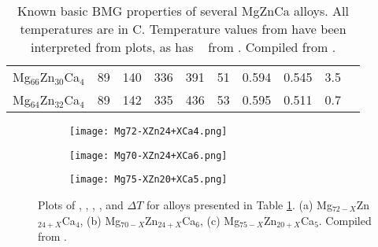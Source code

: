 \documentclass[a4paper,12pt,oneside]{report}%
\begin{document}
\begin{table}[h]
\begin{tabular}{ l l l l l l l l l l }
		Mg$_{66}$Zn$_{30}$Ca$_{4}$ & 89 & 140 & 336 & 391 & 51 & 0.594 & 0.545 & 3.5 & \cite{Cao2013, Cao2012} \\ 
		Mg$_{64}$Zn$_{32}$Ca$_{4}$ & 89 & 142 & 335 & 436 & 53 & 0.595 & 0.511 & 0.7 & \cite{Cao2013, Cao2012} \\
		\bottomrule 
	\end{tabular}
	\caption[Known basic BMG properties of several MgZnCa alloys. All temperatures are in \degree C.]{Known basic BMG properties of several MgZnCa alloys. All temperatures are in \degree C. Temperature values from \cite{Gu2005} have been interpreted from plots, as has \Tg~ from \cite{Wang2013}. Compiled from \cite{Cao2013, Gu2005, Zhou2013, Cao2012, Wang2013}.}
	\label{tab:MgZnCaAlloys}
\end{table}

\begin{figure}[htbp]
	\centering
	\begin{subfigure}[htbp]{0.49\textwidth}
		\texttt{[image: Mg72-XZn24+XCa4.png]}
		\caption{}
		\label{fig:Mg72xZn24xCa4}
	\end{subfigure}
	\begin{subfigure}[htbp]{0.49\textwidth}
		\texttt{[image: Mg70-XZn24+XCa6.png]}
		\caption{}
		\label{fig:Mg70xZn24xCa6}
	\end{subfigure}
	\begin{subfigure}[htbp]{0.49\textwidth}
		\texttt{[image: Mg75-XZn20+XCa5.png]}
		\caption{}
		\label{fig:Mg75xZn20xCa5}
	\end{subfigure}
	\caption[Plots of \Tg, \Tx, \Tm, \Tl, and $\Delta T$ for alloys presented in Table \ref{tab:MgZnCaAlloys}. (a) Mg$_{72-X}$Zn$_{24+X}$Ca$_{4}$, (b) Mg$_{70-X}$Zn$_{24+X}$Ca$_{6}$, (c) Mg$_{75-X}$Zn$_{20+X}$Ca$_{5}$.]{Plots of \Tg, \Tx, \Tm, \Tl, and $\Delta T$ for alloys presented in Table \ref{tab:MgZnCaAlloys}. (a) Mg$_{72-X}$Zn$_{24+X}$Ca$_{4}$, (b) Mg$_{70-X}$Zn$_{24+X}$Ca$_{6}$, (c) Mg$_{75-X}$Zn$_{20+X}$Ca$_{5}$. Compiled from \cite{Cao2013, Gu2005, Zhou2013, Cao2012, Wang2013}.}%
	\label{fig:MgZnCaPlots}
\end{figure}


\newpage

\printglossaries
\end{document}
